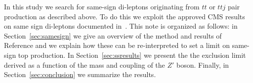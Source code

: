 In this study we search for same-sign di-leptons originating from $tt$ or $ttj$ pair production as described above.
To do this we exploit the approved CMS results on same sign di-leptons documented in~\cite{ssnote1, sspaper}.
This note is organized as follows: 
in Section~\ref{sec:samesign} we give an overview of the method and results of Reference \cite{sspaper}
and we explain how these can be re-interpreted to set a limit on same-sign top production.
In Section~\ref{sec:ssresults} we present the the exclusion limit derived as a function of the mass and coupling of the $Z'$ boson.
Finally, in Section~\ref{sec:conclusion} we summarize the results.  


%
